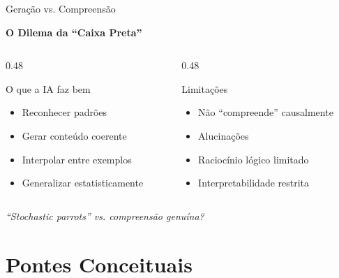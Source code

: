 \documentclass[aspectratio=169,12pt]{beamer}
\begin{document}
\begin{frame}{Geração vs. Compreensão}
    \begin{center}
        \Large\textbf{O Dilema da ``Caixa Preta''}
    \end{center}

    \vspace{0.5cm}

    \begin{columns}[T]
        \begin{column}{0.48\textwidth}
            \begin{block}{O que a IA faz bem}
                \begin{itemize}
                    \item Reconhecer padrões
                    \item Gerar conteúdo coerente
                    \item Interpolar entre exemplos
                    \item Generalizar estatisticamente
                \end{itemize}
            \end{block}
        \end{column}
        \begin{column}{0.48\textwidth}
            \begin{alertblock}{Limitações}
                \begin{itemize}
                    \item Não ``compreende'' causalmente
                    \item Alucinações
                    \item Raciocínio lógico limitado
                    \item Interpretabilidade restrita
                \end{itemize}
            \end{alertblock}
        \end{column}
    \end{columns}

    \vspace{0.5cm}
    \begin{center}
        \textit{``Stochastic parrots'' vs. compreensão genuína?}
    \end{center}
\end{frame}

\section{Pontes Conceituais}
\end{document}
